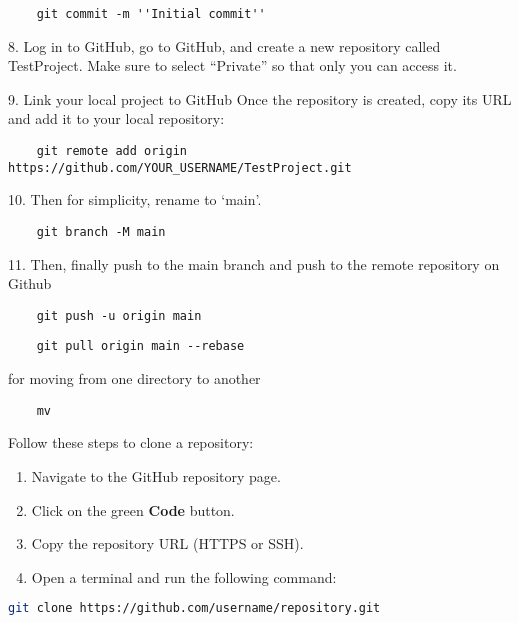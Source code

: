 \begin{lstlisting}
    git commit -m ''Initial commit''
\end{lstlisting}

8. Log in to GitHub, go to GitHub, and create a new repository called TestProject. Make sure to select ``Private'' so that only you can access it.

9. Link your local project to GitHub
Once the repository is created, copy its URL and add it to your local repository:

\begin{lstlisting}
    git remote add origin https://github.com/YOUR_USERNAME/TestProject.git
\end{lstlisting}

10. Then for simplicity, rename to `main'.

\begin{lstlisting}
    git branch -M main
\end{lstlisting}

11. Then, finally push to the main branch and push to the remote repository on Github

\begin{lstlisting}
    git push -u origin main
\end{lstlisting}

\begin{lstlisting}
    git pull origin main --rebase
\end{lstlisting}

for moving from one directory to another

\begin{lstlisting}
    mv
\end{lstlisting}

Follow these steps to clone a repository:

\begin{enumerate}
    \item Navigate to the GitHub repository page.
    \item Click on the green \textbf{Code} button.
    \item Copy the repository URL (HTTPS or SSH).
    \item Open a terminal and run the following command:
\end{enumerate}

\begin{lstlisting}[language=bash]
git clone https://github.com/username/repository.git
\end{lstlisting}

